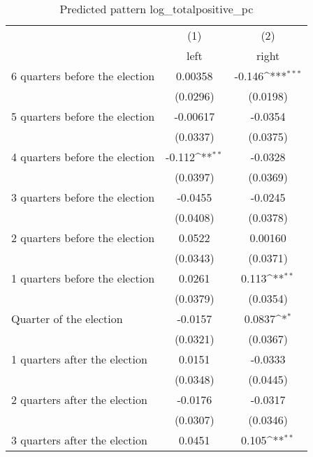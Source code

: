 \begin{table}[htbp]\centering
\def\sym#1{\ifmmode^{#1}\else\(^{#1}\)\fi}
\caption{Predicted pattern log\_totalpositive\_pc}
\begin{tabular}{l*{2}{c}}
\hline\hline
                    &\multicolumn{1}{c}{(1)}&\multicolumn{1}{c}{(2)}\\
                    &\multicolumn{1}{c}{left}&\multicolumn{1}{c}{right}\\
\hline
 6 quarters before the election&     0.00358         &      -0.146\sym{***}\\
                    &    (0.0296)         &    (0.0198)         \\
[1em]
 5 quarters before the election&    -0.00617         &     -0.0354         \\
                    &    (0.0337)         &    (0.0375)         \\
[1em]
 4 quarters before the election&      -0.112\sym{**} &     -0.0328         \\
                    &    (0.0397)         &    (0.0369)         \\
[1em]
 3 quarters before the election&     -0.0455         &     -0.0245         \\
                    &    (0.0408)         &    (0.0378)         \\
[1em]
 2 quarters before the election&      0.0522         &     0.00160         \\
                    &    (0.0343)         &    (0.0371)         \\
[1em]
 1 quarters before the election&      0.0261         &       0.113\sym{**} \\
                    &    (0.0379)         &    (0.0354)         \\
[1em]
Quarter of the election&     -0.0157         &      0.0837\sym{*}  \\
                    &    (0.0321)         &    (0.0367)         \\
[1em]
 1 quarters after the election&      0.0151         &     -0.0333         \\
                    &    (0.0348)         &    (0.0445)         \\
[1em]
 2 quarters after the election&     -0.0176         &     -0.0317         \\
                    &    (0.0307)         &    (0.0346)         \\
[1em]
 3 quarters after the election&      0.0451         &       0.105\sym{**} \\

\end{tabular}
\end{table}
